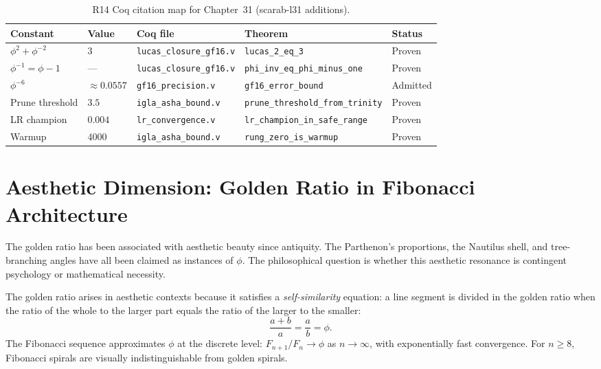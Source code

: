 \begin{table}[H]
  \centering
  \caption{R14 Coq citation map for Chapter~31 (scarab-l31 additions).}
  \label{tab:coq-map-31-scarab}
  \begin{tabular}{lllll}
    \hline
    \textbf{Constant} & \textbf{Value} & \textbf{Coq file} & \textbf{Theorem} & \textbf{Status} \\
    \hline
    \(\phi^2 + \phi^{-2}\) & \(3\) & \texttt{lucas\_closure\_gf16.v} & \texttt{lucas\_2\_eq\_3} & Proven \\
    \(\phi^{-1} = \phi - 1\) & — & \texttt{lucas\_closure\_gf16.v} & \texttt{phi\_inv\_eq\_phi\_minus\_one} & Proven \\
    \(\phi^{-6}\) & \(\approx 0.0557\) & \texttt{gf16\_precision.v} & \texttt{gf16\_error\_bound} & Admitted \\
    Prune threshold & \(3.5\) & \texttt{igla\_asha\_bound.v} & \texttt{prune\_threshold\_from\_trinity} & Proven \\
    LR champion & \(0.004\) & \texttt{lr\_convergence.v} & \texttt{lr\_champion\_in\_safe\_range} & Proven \\
    Warmup & \(4000\) & \texttt{igla\_asha\_bound.v} & \texttt{rung\_zero\_is\_warmup} & Proven \\
    \hline
  \end{tabular}
\end{table}

\section{Aesthetic Dimension: Golden Ratio in Fibonacci Architecture}
\label{sec:phd31-aesthetics}

The golden ratio has been associated with aesthetic beauty since antiquity.
The Parthenon's proportions, the Nautilus shell, and tree-branching angles have
all been claimed as instances of \(\phi\).  The philosophical question is
whether this aesthetic resonance is contingent psychology or mathematical
necessity.

The golden ratio arises in aesthetic contexts because it satisfies a
\emph{self-similarity} equation: a line segment is divided in the golden ratio
when the ratio of the whole to the larger part equals the ratio of the larger
to the smaller:
\[
  \frac{a+b}{a} = \frac{a}{b} = \phi.
\]
The Fibonacci sequence approximates \(\phi\) at the discrete level:
\(F_{n+1}/F_n \to \phi\) as \(n \to \infty\), with exponentially fast
convergence.  For \(n \ge 8\), Fibonacci spirals are visually
indistinguishable from golden spirals.

